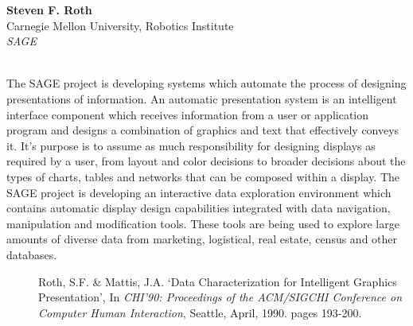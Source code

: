 \begin{center}
 \end{center}
\begin{center}
\end{center}
\begin{tabular}
{\bf Steven F. Roth}\\
Carnegie Mellon University, Robotics Institute\\
{\it SAGE}\\
\\
\end{tabular}
The SAGE project is developing systems which automate the process of
designing presentations of information.  An automatic presentation system is
an intelligent interface component which receives information from a user or
application program and designs a combination of graphics and text that
effectively conveys it.  It's  purpose is to assume as much responsibility
for designing displays as required by a user, from layout and color
decisions to broader decisions about the types of charts, tables and
networks that can be composed within a display.  The SAGE project is
developing an interactive data exploration environment which contains
automatic display design capabilities integrated with data navigation,
manipulation and modification tools. These tools are being used to
explore large amounts of diverse data from marketing, logistical, real
estate, census and other databases.
\begin{description}
\item[] Roth, S.F. \& Mattis, J.A.  `Data Characterization for Intelligent
Graphics Presentation', In {\it CHI'90: Proceedings of the ACM/SIGCHI Conference
on Computer Human Interaction}, Seattle, April, 1990. pages 193-200.
\end{description}
\newpage{}


